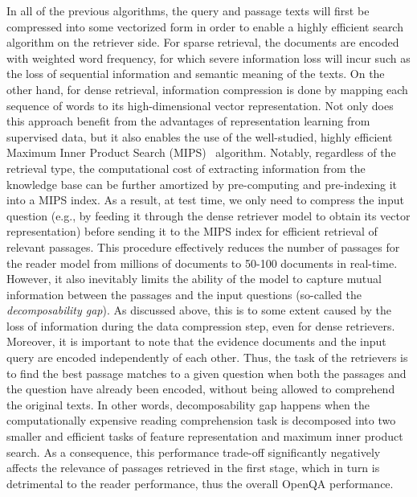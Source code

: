 %
In all of the previous algorithms, the query and passage texts will first be compressed into some vectorized form in order to enable a highly efficient search algorithm on the retriever side.
%
For sparse retrieval, the documents are encoded with weighted word frequency, for which severe information loss will incur such as the loss of sequential information and semantic meaning of the texts.
%
On the other hand, for dense retrieval, information compression is done by mapping each sequence of words to its high-dimensional vector representation.
%
Not only does this approach benefit from the advantages of representation learning from supervised data, but it also enables the use of the well-studied, highly efficient Maximum Inner Product Search (MIPS)~\cite{johnson2019billion} algorithm.
%
Notably, regardless of the retrieval type, the computational cost of extracting information from the knowledge base can be further amortized by pre-computing and pre-indexing it into a MIPS index.
%
As a result, at test time, we only need to compress the input question (e.g., by feeding it through the dense retriever model to obtain its vector representation) before sending it to the MIPS index for efficient retrieval of relevant passages.
%
This procedure effectively reduces the number of passages for the reader model from millions of documents to 50-100 documents in real-time.
%
However, it also inevitably limits the ability of the model to capture mutual information between the passages and the input questions (so-called the \emph{decomposability gap}).
%
As discussed above, this is to some extent caused by the loss of information during the data compression step, even for dense retrievers.
%
Moreover, it is important to note that the evidence documents and the input query are encoded independently of each other.
%
Thus, the task of the retrievers is to find the best passage matches to a given question when both the passages and the question have already been encoded, without being allowed to comprehend the original texts.
%
In other words, decomposability gap happens when the computationally expensive reading comprehension task is decomposed into two smaller and efficient tasks of feature representation and maximum inner product search.
%
As a consequence, this performance trade-off significantly negatively affects the relevance of passages retrieved in the first stage, which in turn is detrimental to the reader performance, thus the overall OpenQA performance.

